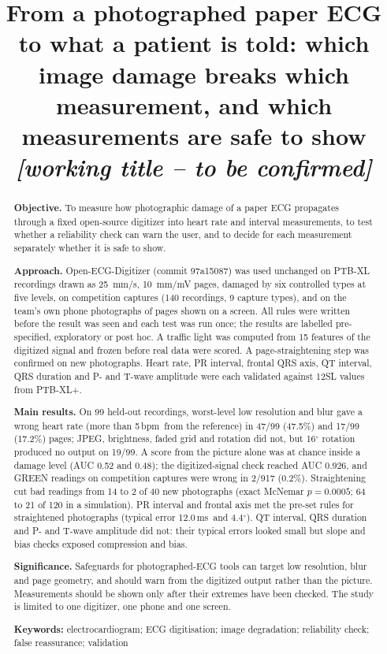 \documentclass[11pt,a4paper]{article}
\title{From a photographed paper ECG to what a patient is told: which image damage breaks which measurement, and which measurements are safe to show\\[2pt]
\large\textit{[working title -- to be confirmed]}}
\author{\todo{author names, affiliations, corresponding author e-mail}}
\date{}
\newcommand{\bpm}{\,bpm}
\newcommand{\ms}{\,ms}
\begin{document}
\maketitle

\begin{abstract}
\noindent\textbf{Objective.} To measure how photographic damage of a paper ECG propagates through a fixed open-source digitizer into heart rate and interval measurements, to test whether a reliability check can warn the user, and to decide for each measurement separately whether it is safe to show.

\noindent\textbf{Approach.} Open-ECG-Digitizer (commit 97a15087) was used unchanged on PTB-XL recordings drawn as 25~mm/s, 10~mm/mV pages, damaged by six controlled types at five levels, on competition captures (140 recordings, 9 capture types), and on the team's own phone photographs of pages shown on a screen. All rules were written before the result was seen and each test was run once; the results are labelled pre-specified, exploratory or post hoc. A traffic light was computed from 15 features of the digitized signal and frozen before real data were scored. A page-straightening step was confirmed on new photographs. Heart rate, PR interval, frontal QRS axis, QT interval, QRS duration and P- and T-wave amplitude were each validated against 12SL values from PTB-XL+.

\noindent\textbf{Main results.} On 99 held-out recordings, worst-level low resolution and blur gave a wrong heart rate (more than 5\bpm\ from the reference) in 47/99 (47.5\%) and 17/99 (17.2\%) pages; JPEG, brightness, faded grid and rotation did not, but 16$^\circ$ rotation produced no output on 19/99. A score from the picture alone was at chance inside a damage level (AUC 0.52 and 0.48); the digitized-signal check reached AUC 0.926, and GREEN readings on competition captures were wrong in 2/917 (0.2\%). Straightening cut bad readings from 14 to 2 of 40 new photographs (exact McNemar $p=0.0005$; 64 to 21 of 120 in a simulation). PR interval and frontal axis met the pre-set rules for straightened photographs (typical error 12.0\ms\ and 4.4$^\circ$). QT interval, QRS duration and P- and T-wave amplitude did not: their typical errors looked small but slope and bias checks exposed compression and bias.

\noindent\textbf{Significance.} Safeguards for photographed-ECG tools can target low resolution, blur and page geometry, and should warn from the digitized output rather than the picture. Measurements should be shown only after their extremes have been checked. The study is limited to one digitizer, one phone and one screen.

\medskip
\noindent\textbf{Keywords:} electrocardiogram; ECG digitisation; image degradation; reliability check; false reassurance; validation
\end{abstract}
\end{document}
